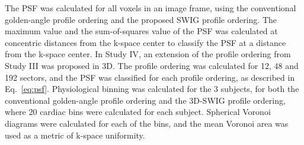 The PSF was calculated for all voxels in an image frame, using the conventional golden-angle profile ordering and the proposed SWIG profile ordering. The maximum value and the sum-of-squares value of the PSF was calculated at concentric distances from the k-space center to classify the PSF at a distance from the k-space center.
In Study IV, an extension of the profile ordering from Study III was proposed in 3D. The profile ordering was calculated for 12, 48 and 192 sectors, and the PSF was classified for each profile ordering, as described in Eq.~\ref{eq:psf}. Physiological binning was calculated for the 3 subjects, for both the conventional golden-angle profile ordering and the 3D-SWIG profile ordering, where 20 cardiac bins were calculated for each subject. Spherical Voronoi diagrams were calculated for each of the bins, and the mean Voronoi area was used as a metric of k-space uniformity.

